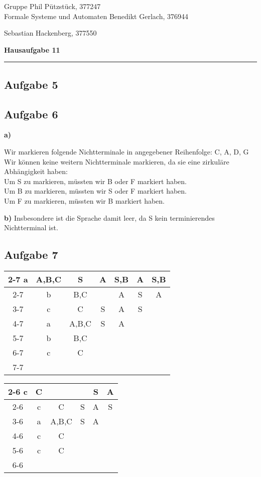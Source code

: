 \documentclass[a4paper,graphics,11pt]{article}
\newcommand{\aufgabe}[1]{\subsection*{Aufgabe #1}}
\begin{document}
\noindent Gruppe              \hfill Phil Pützstück, 377247\\
\noindent Formale Systeme und Automaten \hfill Benedikt Gerlach, 376944\\
\strut\hfill Sebastian Hackenberg, 377550\\
\begin{center}
	\LARGE{\textbf{Hausaufgabe 11}}
\end{center}
\begin{center}
\rule[0.1ex]{\textwidth}{1pt}
\end{center}



\aufgabe{5}
\newpage
\aufgabe{6}
\textbf{a)}

Wir markieren folgende Nichtterminale in angegebener Reihenfolge:
C, A, D, G\\
Wir können keine weitern Nichtterminale markieren, da sie eine zirkuläre
Abhängigkeit haben:\\
Um S zu markieren, müssten wir B oder F markiert haben.\\
Um B zu markieren, müssten wir S oder F markiert haben.\\
Um F zu markieren, müssten wir B markiert haben.

\textbf{b)}
Insbesondere ist die Sprache damit leer, da S kein terminierendes Nichtterminal ist.

\aufgabe{7}
\begin{minipage}{0.5\textwidth}
\begin{tabular}{*{7}{c|}}
                                                            \cline{2-7}
                            a & A,B,C   & S & A & S,B & A & S,B   \\  \cline{2-7}
    \multicolumn{1}{c} {} & b & B,C     &   & A & S & A       \\  \cline{3-7}
    \multicolumn{2}{c} {} & c & C       & S & A & S           \\  \cline{4-7}
    \multicolumn{3}{c} {} & a & A,B,C   & S & A               \\  \cline{5-7}
    \multicolumn{4}{c} {} & b & B,C     &                     \\  \cline{6-7}
    \multicolumn{5}{c} {} & c & C                       \\  \cline{7-7}
\end{tabular}
\end{minipage}
\begin{minipage}{0.5\textwidth}
\begin{tabular}{*{6}{c|}}
                                                        \cline{2-6}
                            c & C &   &   & S & A   \\  \cline{2-6}
    \multicolumn{1}{c} {} & c & C & S & A & S       \\  \cline{3-6}
    \multicolumn{2}{c} {} & a & A,B,C & S & A           \\  \cline{4-6}
    \multicolumn{3}{c} {} & c & C &                 \\  \cline{5-6}
    \multicolumn{4}{c} {} & c & C                   \\  \cline{6-6}
\end{tabular}
\end{minipage}
\end{document}
